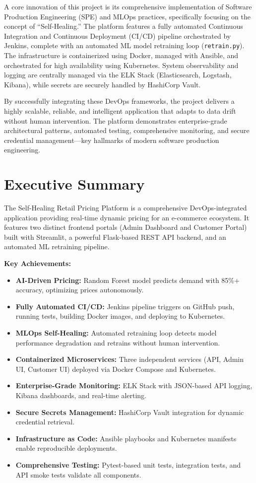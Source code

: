 \documentclass[12pt,a4paper]{report}
\begin{document}
A core innovation of this project is its comprehensive implementation of Software Production Engineering (SPE) and MLOps practices, specifically focusing on the concept of ``Self-Healing.'' The platform features a fully automated Continuous Integration and Continuous Deployment (CI/CD) pipeline orchestrated by Jenkins, complete with an automated ML model retraining loop (\texttt{retrain.py}). The infrastructure is containerized using Docker, managed with Ansible, and orchestrated for high availability using Kubernetes. System observability and logging are centrally managed via the ELK Stack (Elasticsearch, Logstash, Kibana), while secrets are securely handled by HashiCorp Vault. 

By successfully integrating these DevOps frameworks, the project delivers a highly scalable, reliable, and intelligent application that adapts to data drift without human intervention. The platform demonstrates enterprise-grade architectural patterns, automated testing, comprehensive monitoring, and secure credential management---key hallmarks of modern software production engineering.

\section{Executive Summary}

The Self-Healing Retail Pricing Platform is a comprehensive DevOps-integrated application providing real-time dynamic pricing for an e-commerce ecosystem. It features two distinct frontend portals (Admin Dashboard and Customer Portal) built with Streamlit, a powerful Flask-based REST API backend, and an automated ML retraining pipeline.

\textbf{Key Achievements:}
\begin{itemize}[leftmargin=2em]
    \item \textbf{AI-Driven Pricing:} Random Forest model predicts demand with 85\%+ accuracy, optimizing prices autonomously.
    \item \textbf{Fully Automated CI/CD:} Jenkins pipeline triggers on GitHub push, running tests, building Docker images, and deploying to Kubernetes.
    \item \textbf{MLOps Self-Healing:} Automated retraining loop detects model performance degradation and retrains without human intervention.
    \item \textbf{Containerized Microservices:} Three independent services (API, Admin UI, Customer UI) deployed via Docker Compose and Kubernetes.
    \item \textbf{Enterprise-Grade Monitoring:} ELK Stack with JSON-based API logging, Kibana dashboards, and real-time alerting.
    \item \textbf{Secure Secrets Management:} HashiCorp Vault integration for dynamic credential retrieval.
    \item \textbf{Infrastructure as Code:} Ansible playbooks and Kubernetes manifests enable reproducible deployments.
    \item \textbf{Comprehensive Testing:} Pytest-based unit tests, integration tests, and API smoke tests validate all components.
\end{itemize}
\end{document}
